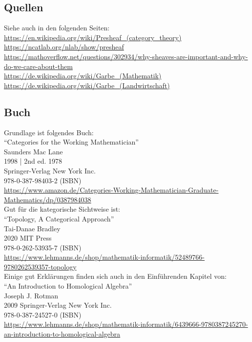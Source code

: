 \documentclass[a4paper]{amsart}
\theoremstyle{definition}
\begin{document}
\subsection*{Quellen}
Siehe auch in den folgenden Seiten:\\
\url{https://en.wikipedia.org/wiki/Presheaf_(category_theory)}\\
\url{https://ncatlab.org/nlab/show/presheaf}\\
\url{https://mathoverflow.net/questions/302934/why-sheaves-are-important-and-why-do-we-care-about-them}\\
\url{https://de.wikipedia.org/wiki/Garbe_(Mathematik)}\\
\url{https://de.wikipedia.org/wiki/Garbe_(Landwirtschaft)}

\subsection*{Buch}
Grundlage ist folgendes Buch:\\
"`Categories for the Working Mathematician"'\\
Saunders Mac Lane\\
1998 | 2nd ed. 1978\\
Springer-Verlag New York Inc.\\
978-0-387-98403-2 (ISBN)\\
{\tiny
   \url{https://www.amazon.de/Categories-Working-Mathematician-Graduate-Mathematics/dp/0387984038}}\\

Gut für die kategorische Sichtweise ist:\\
"`Topology, A Categorical Approach"'\\
Tai-Danae Bradley\\
2020 MIT Press\\
978-0-262-53935-7 (ISBN)\\
{\tiny
\url{https://www.lehmanns.de/shop/mathematik-informatik/52489766-9780262539357-topology}}\\

Einige gut Erklärungen finden sich auch in den Einführenden Kapitel von:\\
"`An Introduction to Homological Algebra"'\\
Joseph J. Rotman\\
2009 Springer-Verlag New York Inc.\\
978-0-387-24527-0 (ISBN)\\
{\tiny \url{https://www.lehmanns.de/shop/mathematik-informatik/6439666-9780387245270-an-introduction-to-homological-algebra}}\\
\end{document}
